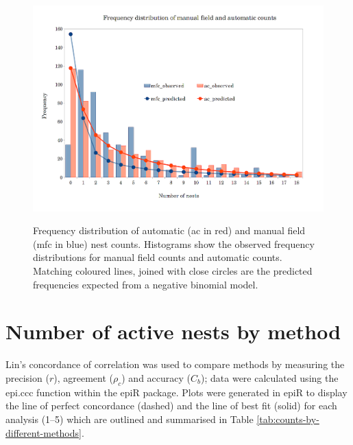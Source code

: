 \begin{figure}
\myfloatalign
{\includegraphics[width=0.9\linewidth]{gfx6/results/binomial}}
\caption [Frequency distribution of nest counts.]{Frequency distribution of automatic (ac in red) and manual field (mfc in blue) nest counts. Histograms show the observed frequency distributions for manual field counts and automatic counts. Matching coloured lines, joined with close circles are the predicted frequencies expected from a negative binomial model.} \label{fig:binomial}
\end{figure}
\clearpage

\section{Number of active nests by method}\label{sec:number-of-active-nests-by-method}

Lin's concordance of correlation was used to compare methods by measuring the precision ($ r $), agreement ($\rho_{c}$) and accuracy ($C_{b}$); data were calculated using the epi.ccc function within the epiR package. Plots were generated in epiR to display the line of perfect concordance (dashed) and the  line of best fit (solid) for each analysis (1--5) which are outlined  and summarised in Table \ref{tab:counts-by-different-methods}. 

